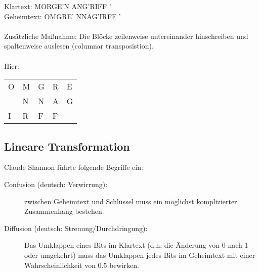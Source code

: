 \documentclass[a4paper,12pt]{article}
\begin{document}
Klartext: MORGE'N ANG'RIFF '\\
Geheimtext: OMGRE' NNAG'IRFF '\\
\\
Zusätzliche Maßnahme: Die Blöcke zeilenweise untereinander hinschreiben und spaltenweise auslesen (\glqq{}columnar transposistion\grqq).\\
\\
Hier:
\begin{table}[h]
\centering
\begin{tabular}{l l l l l}
O & M & G & R & E\\
 & N & N & A & G\\
I & R & F & F & 
\end{tabular}
\end{table}

\subsection{Lineare Transformation}
Claude Shannon führte folgende Begriffe ein:\\
\begin{description}
 \item[Confusion (deutsch: Verwirrung):] zwischen Geheimtext und Schlüssel muss ein möglichst komplizierter Zusammenhang bestehen.
 \item[Diffusion (deutsch: Streuung/Durchdringung):] Das Umklappen eines Bits im Klartext (d.h. die Änderung von 0 nach 1 oder umgekehrt) muss das Umklappen jedes Bits im Geheimtext mit einer Wahrscheinlichkeit von 0.5 bewirken.
\end{description}
\end{document}
